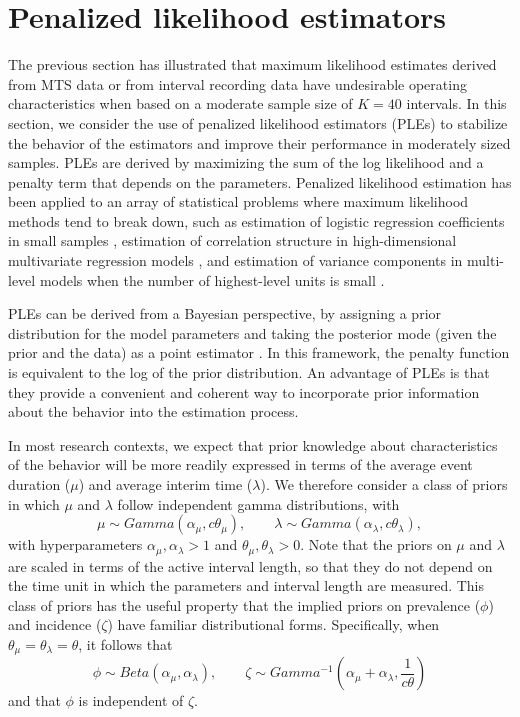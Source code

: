 \documentclass[man, noextraspace, floatsintext]{apa6}\usepackage[]{graphicx}\usepackage[]{color}
\begin{document}
\section{Penalized likelihood estimators}

The previous section has illustrated that maximum likelihood estimates derived from MTS data or from interval recording data have undesirable operating characteristics when based on a moderate sample size of $K = 40$ intervals. 
In this section, we consider the use of penalized likelihood estimators (PLEs) to stabilize the behavior of the estimators and improve their performance in moderately sized samples. 
PLEs are derived by maximizing the sum of the log likelihood and a penalty term that depends on the parameters. 
Penalized likelihood estimation has been applied to an array of statistical problems where maximum likelihood methods tend to break down, such as estimation of logistic regression coefficients in small samples \citep{Galindo-Garre2004bayesian, Gelman2008weakly}, estimation of correlation structure in high-dimensional multivariate regression models \citep{Warton2008penalized}, and estimation of variance components in multi-level models when the number of highest-level units is small \citep{Chung2012non-degenerate}. 

PLEs can be derived from a Bayesian perspective, by assigning a prior distribution for the model parameters and taking the posterior mode (given the prior and the data) as a point estimator \citep{Chung2012non-degenerate}. 
In this framework, the penalty function is equivalent to the log of the prior distribution. 
An advantage of PLEs is that they provide a convenient and coherent way to incorporate prior information about the behavior into the estimation process. 

In most research contexts, we expect that prior knowledge about characteristics of the behavior will be more readily expressed in terms of the average event duration ($\mu$) and average interim time ($\lambda$). 
We therefore consider a class of priors in which $\mu$ and $\lambda$ follow independent gamma distributions, with \[
\mu \sim Gamma\left(\alpha_\mu, c \theta_\mu\right), \qquad \lambda \sim Gamma\left(\alpha_\lambda, c \theta_\lambda\right), \]
with hyperparameters $\alpha_\mu, \alpha_\lambda > 1$ and $\theta_\mu, \theta_\lambda > 0$. 
Note that the priors on $\mu$ and $\lambda$ are scaled in terms of the active interval length, so that they do not depend on the time unit in which the parameters and interval length are measured. 
This class of priors has the useful property that the implied priors on prevalence ($\phi$) and incidence ($\zeta$) have familiar distributional forms. 
Specifically, when $\theta_\mu = \theta_\lambda = \theta$, it follows that \[
\phi \sim Beta\left(\alpha_\mu, \alpha_\lambda \right), \qquad \zeta \sim Gamma^{-1}\left(\alpha_\mu + \alpha_\lambda, \frac{1}{c\theta} \right) \]
and that $\phi$ is independent of $\zeta$. 
\end{document}
